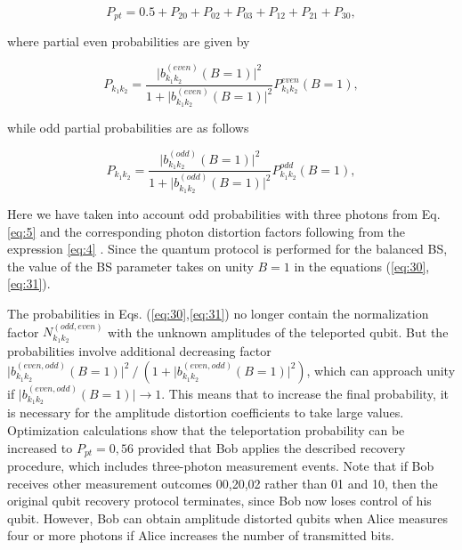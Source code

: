 \documentclass{optica-article}
\begin{document}
\begin{equation}\label{eq:29}
     P_{pt} = 0.5 + P_{20}+ P_{02}+ P_{03}+ P_{12}+ P_{21}+ P_{30},  
\end{equation}

\!\!\!\!\!\!where partial even probabilities are given by 


\begin{equation}\label{eq:30}
     P_{k_1k_2} = \frac{\lvert b_{k_1k_2}^{(even)}(B=1)\rvert ^2}{1 + \lvert b_{k_1k_2}^{(even)}(B=1)\rvert ^2}P_{k_1k_2}^{even}(B=1),  
\end{equation}



\!\!\!\!\!\!while odd partial probabilities are as follows       


\begin{equation}\label{eq:31}
     P_{k_1k_2} = \frac{\lvert b_{k_1k_2}^{(odd)}(B=1)\rvert ^2}{1 + \lvert b_{k_1k_2}^{(odd)}(B=1)\rvert ^2}P_{k_1k_2}^{odd}(B=1),  
\end{equation}


\!\!\!\!\!\!Here we have taken into account odd probabilities with three photons from Eq. \eqref{eq:5}  and the corresponding photon distortion factors following from the expression \eqref{eq:4} . Since the quantum protocol is performed for the balanced BS, the value of the BS parameter takes on unity $B=1$ in the equations (\ref{eq:30},\ref{eq:31}). 
\par The probabilities in Eqs. (\ref{eq:30},\ref{eq:31}) no longer contain the normalization factor $N_{k_1 k_2}^{(odd,even)}$ with the unknown amplitudes of the teleported qubit. But the probabilities involve additional decreasing factor $\lvert b_{k_1k_2}^{(even,odd)}(B=1)\rvert^2⁄(1+\lvert b_{k_1k_2}^{(even,odd)}(B=1)\rvert ^2 )$, which can approach unity if $\lvert b_{k_1  k_2}^{(even,odd)}(B=1)\rvert \rightarrow 1$. This means that to increase the final probability, it is necessary for the amplitude distortion coefficients to take large values. Optimization calculations show that the teleportation probability can be increased to $P_{pt}=0,56$ provided that Bob applies the described recovery procedure, which includes three-photon measurement events. Note that if Bob receives other measurement outcomes 00,20,02 rather than 01 and 10, then the original qubit recovery protocol terminates, since Bob now loses control of his qubit. However, Bob can obtain amplitude distorted qubits when Alice measures four or more photons if Alice increases the number of transmitted bits.
\end{document}
